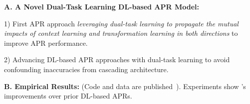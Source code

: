 
{\bf A. A Novel Dual-Task Learning DL-based APR Model:}

1) First APR approach {\em leveraging dual-task learning to propagate
  the mutual impacts of context learning and transformation learning
  in both directions} to improve APR performance.

2) Advancing DL-based APR approaches with dual-task learning
to avoid confounding inaccuracies from cascading architecture.




{\bf B. Empirical Results:} (Code and data are
published~\cite{CDFix2022}).
Experiments show {\tool}'s improvements over prior
DL-based APRs.




